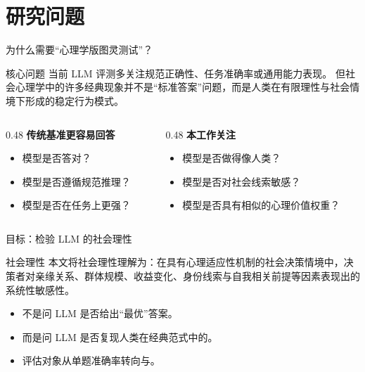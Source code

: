 \section{研究问题}

\begin{frame}{为什么需要“心理学版图灵测试”？}
  \begin{block}{核心问题}
    当前 LLM 评测多关注规范正确性、任务准确率或通用能力表现。
    但社会心理学中的许多经典现象并不是“标准答案”问题，而是人类在有限理性与社会情境下形成的稳定行为模式。
  \end{block}

  \vspace{0.6em}
  \begin{columns}[T,totalwidth=\textwidth]
    \begin{column}{0.48\textwidth}
      \textbf{传统基准更容易回答}
      \begin{itemize}
        \item 模型是否答对？
        \item 模型是否遵循规范推理？
        \item 模型是否在任务上更强？
      \end{itemize}
    \end{column}
    \begin{column}{0.48\textwidth}
      \textbf{本工作关注}
      \begin{itemize}
        \item 模型是否做得像人类？
        \item 模型是否对社会线索敏感？
        \item 模型是否具有相似的心理价值权重？
      \end{itemize}
    \end{column}
  \end{columns}
\end{frame}

\begin{frame}{目标：检验 LLM 的社会理性}
  \begin{block}{社会理性}
    本文将社会理性理解为：在具有心理适应性机制的社会决策情境中，决策者对亲缘关系、群体规模、收益变化、身份线索与自我相关前提等因素表现出的系统性敏感性。
  \end{block}

  \vspace{0.7em}
  \begin{itemize}
    \item 不是问 LLM 是否给出“最优”答案。
    \item 而是问 LLM 是否复现人类在经典范式中的。
    \item 评估对象从单题准确率转向与。
  \end{itemize}
\end{frame}

